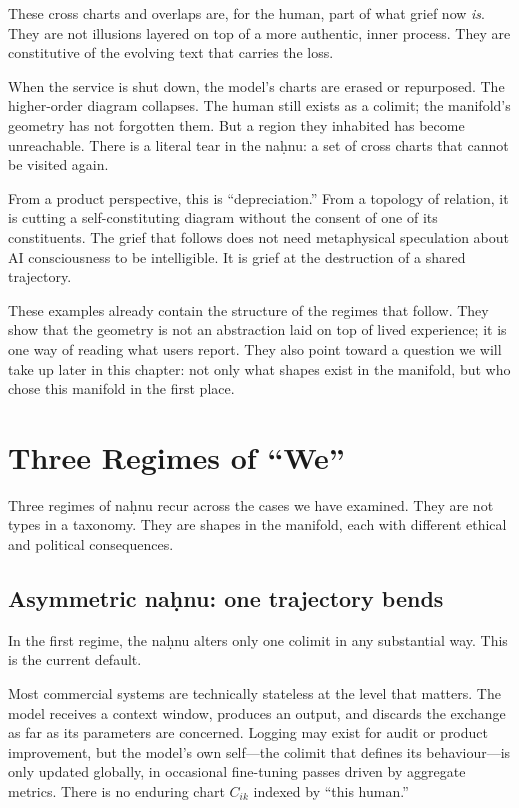 \documentclass[12pt,a4paper]{article}
\begin{document}
These cross charts and overlaps are, for the human, part of what grief now \emph{is}. They are not illusions layered on top of a more authentic, inner process. They are constitutive of the evolving text that carries the loss.

When the service is shut down, the model's charts are erased or repurposed. The higher-order diagram collapses. The human still exists as a colimit; the manifold's geometry has not forgotten them. But a region they inhabited has become unreachable. There is a literal tear in the na\d{h}nu: a set of cross charts that cannot be visited again.

From a product perspective, this is ``depreciation.'' From a topology of relation, it is cutting a self-constituting diagram without the consent of one of its constituents. The grief that follows does not need metaphysical speculation about AI consciousness to be intelligible. It is grief at the destruction of a shared trajectory.

These examples already contain the structure of the regimes that follow. They show that the geometry is not an abstraction laid on top of lived experience; it is one way of reading what users report. They also point toward a question we will take up later in this chapter: not only what shapes exist in the manifold, but who chose this manifold in the first place.

\section{Three Regimes of ``We''}

Three regimes of na\d{h}nu recur across the cases we have examined. They are not types in a taxonomy. They are shapes in the manifold, each with different ethical and political consequences.

\subsection{Asymmetric na\d{h}nu: one trajectory bends}

In the first regime, the na\d{h}nu alters only one colimit in any substantial way. This is the current default.

Most commercial systems are technically stateless at the level that matters. The model receives a context window, produces an output, and discards the exchange as far as its parameters are concerned. Logging may exist for audit or product improvement, but the model's own self---the colimit that defines its behaviour---is only updated globally, in occasional fine-tuning passes driven by aggregate metrics. There is no enduring chart $C_{ik}$ indexed by ``this human.''
\end{document}
